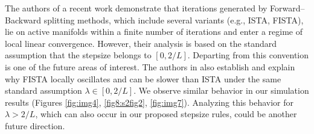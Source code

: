 \documentclass[11pt, a4paper, oneside, reqno]{amsart}
\begin{document}
The authors of a recent work \cite{liang2017activity} demonstrate that iterations generated by Forward–Backward splitting methods, which include several variants (e.g., ISTA, FISTA), lie on active manifolds within a finite number of iterations and enter a regime of local linear convergence. However, their analysis is based on the standard assumption that the stepsize belongs to $[0, 2/L]$. Departing from this convention is one of the future areas of interest. The authors in \cite{liang2017activity} also establish and explain why FISTA locally oscillates and can be slower than ISTA under the same standard assumption $\lambda \in [0,2/L]$. We observe similar behavior in our simulation results (Figures \ref{fig:img4}, \ref{fig8:s2fig2}, \ref{fig:img7}). Analyzing this behavior for $\lambda > 2/L$, which can also occur in our proposed stepsize rules, could be another future direction.


\end{document}
